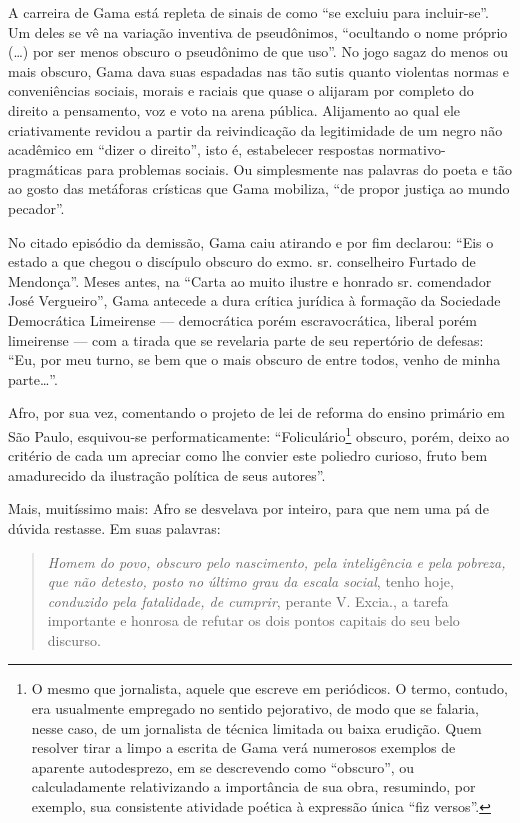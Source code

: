 A carreira de Gama está repleta de sinais de como ``se excluiu para
incluir-se''. Um deles se vê na variação inventiva de pseudônimos,
``ocultando o nome próprio (\ldots{}) por ser menos obscuro o pseudônimo de
que uso''. No jogo sagaz do menos ou mais obscuro, Gama dava suas
espadadas nas tão sutis quanto violentas normas e conveniências sociais,
morais e raciais que quase o alijaram por completo do direito a
pensamento, voz e voto na arena pública. Alijamento ao qual ele
criativamente revidou a partir da reivindicação da legitimidade de um
negro não acadêmico em ``dizer o direito'', isto é, estabelecer respostas
normativo-pragmáticas para problemas sociais. Ou simplesmente nas
palavras do poeta e tão ao gosto das metáforas crísticas que Gama
mobiliza, ``de propor justiça ao mundo pecador''.

No citado episódio da demissão, Gama caiu atirando e por fim declarou:
``Eis o estado a que chegou o discípulo obscuro do exmo. sr. conselheiro
Furtado de Mendonça''. Meses antes, na ``Carta ao muito ilustre e
honrado sr. comendador José Vergueiro'', Gama antecede a dura crítica
jurídica à formação da Sociedade Democrática Limeirense --- democrática
porém escravocrática, liberal porém limeirense --- com a tirada que se
revelaria parte de seu repertório de defesas: ``Eu, por meu turno, se bem
que o mais obscuro de entre todos, venho de minha parte\ldots{}''.

Afro, por sua vez, comentando o projeto de lei de reforma do
ensino primário em São Paulo, esquivou-se performaticamente:
``Foliculário\footnote{O mesmo que jornalista, aquele que escreve em
  periódicos. O termo, contudo, era usualmente empregado no sentido
  pejorativo, de modo que se falaria, nesse caso, de um jornalista de
  técnica limitada ou baixa erudição. Quem resolver tirar a limpo a
  escrita de Gama verá numerosos exemplos de aparente autodesprezo, em
  se descrevendo como ``obscuro'', ou calculadamente relativizando a
  importância de sua obra, resumindo, por exemplo, sua consistente
  atividade poética à expressão única ``fiz versos''.} obscuro, porém,
deixo ao critério de cada um apreciar como lhe convier este poliedro
curioso, fruto bem amadurecido da ilustração política de seus autores''.

Mais, muitíssimo mais: Afro se desvelava por inteiro, para que
nem uma pá de dúvida restasse. Em suas palavras:

\begin{quote}
\textit{Homem do povo, obscuro pelo nascimento, pela inteligência e
pela pobreza, que não detesto, posto no último grau da escala social},
tenho hoje, \textit{conduzido pela fatalidade, de cumprir}, perante V.
Excia., a tarefa importante e honrosa de refutar os dois pontos capitais
do seu belo discurso.
\end{quote}

